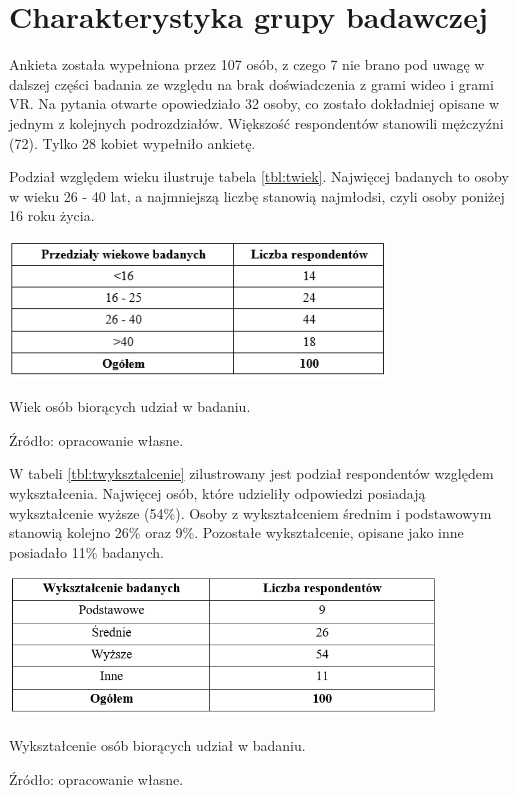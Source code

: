 \section{Charakterystyka grupy badawczej}

Ankieta została wypełniona przez 107 osób, z czego 7 nie brano pod uwagę w dalszej części badania ze względu na brak doświadczenia z grami wideo i grami VR. Na pytania otwarte opowiedziało 32 osoby, co zostało dokładniej opisane w jednym z kolejnych podrozdziałów. Większość respondentów stanowili mężczyźni (72). Tylko 28 kobiet wypełniło ankietę.

Podział względem wieku ilustruje tabela \ref{tbl:twiek}. Najwięcej badanych to osoby w wieku 26 - 40 lat, a najmniejszą liczbę stanowią najmłodsi, czyli osoby poniżej 16 roku życia.

\begin{table}[htb]
  \centering
  \includegraphics[width=0.75\textwidth]{images/twiek.PNG}
  \caption{Wiek osób biorących udział w badaniu.}
  \caption*{Źródło: opracowanie własne.}
  \label{tbl:twiek}
\end{table}

W tabeli \ref{tbl:twyksztalcenie} zilustrowany jest podział respondentów względem wykształcenia. Najwięcej osób, które udzieliły odpowiedzi posiadają wykształcenie wyższe (54\%). Osoby z wykształceniem średnim i podstawowym stanowią kolejno 26\% oraz 9\%. Pozostałe wykształcenie, opisane jako inne posiadało 11\% badanych.

\clearpage

\begin{table}[htb]
  \centering
  \includegraphics[width=0.85\textwidth]{images/twyksztalcenie.PNG}
  \caption{Wykształcenie osób biorących udział w badaniu.}
  \caption*{Źródło: opracowanie własne.}
  \label{tbl:twyksztalcenie}
\end{table}

